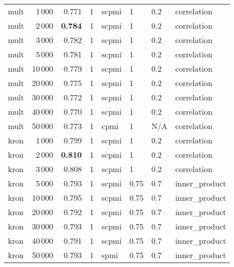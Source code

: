 \begin{tabular}{lrrlllll}
    mult &            1\,000 &  0.771 &     1 &  scpmi &       1 &  0.2 &    correlation \\
    mult &            2\,000 &  \textbf{0.784} &     1 &  scpmi &       1 &  0.2 &    correlation \\
    mult &            3\,000 &  0.782 &     1 &  scpmi &       1 &  0.2 &    correlation \\
    mult &            5\,000 &  0.781 &     1 &  scpmi &       1 &  0.2 &    correlation \\
    mult &           10\,000 &  0.779 &     1 &  scpmi &       1 &  0.2 &    correlation \\
    mult &           20\,000 &  0.775 &     1 &  scpmi &       1 &  0.2 &    correlation \\
    mult &           30\,000 &  0.772 &     1 &  scpmi &       1 &  0.2 &    correlation \\
    mult &           40\,000 &  0.770 &     1 &  scpmi &       1 &  0.2 &    correlation \\
    mult &           50\,000 &  0.773 &     1 &   cpmi &       1 &  N/A &    correlation \\ \addlinespace
    kron &            1\,000 &  0.799 &     1 &  scpmi &       1 &  0.2 &    correlation \\
    kron &            2\,000 &  \textbf{0.810} &     1 &  scpmi &       1 &  0.2 &    correlation \\
    kron &            3\,000 &  0.808 &     1 &  scpmi &       1 &  0.2 &    correlation \\
    kron &            5\,000 &  0.793 &     1 &  scpmi &    0.75 &  0.7 &  inner\_product \\
    kron &           10\,000 &  0.795 &     1 &  scpmi &    0.75 &  0.7 &  inner\_product \\
    kron &           20\,000 &  0.792 &     1 &  scpmi &    0.75 &  0.7 &  inner\_product \\
    kron &           30\,000 &  0.793 &     1 &  scpmi &    0.75 &  0.7 &  inner\_product \\
    kron &           40\,000 &  0.791 &     1 &  scpmi &    0.75 &  0.7 &  inner\_product \\
    kron &           50\,000 &  0.793 &     1 &   spmi &    0.75 &  0.7 &  inner\_product \\
\bottomrule
\end{tabular}
